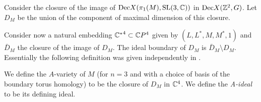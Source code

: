 Consider the closure of the image of $\mathrm{Dec}X(\pi_1(M),\textrm{SL}(3,\mathbb{C}))$ in $\mathrm{Dec}X(\mathbb Z^2,G)$.   Let $D_M$  be the union of the component of maximal dimension of this closure.

Consider now a natural embedding  ${\mathbb{C}^*}^4\subset \mathbb{C} P^4$ given by ${(L,L^*,M,M^*,1)}$ and $\bar D_M$ the closure of the 
image of $D_M$. The ideal boundary of $D_M$ is $\bar D_M\setminus D_M$.  Essentially the following definition was given independently in \cite{Zickert-A-pol}. 

\begin{defn}\label{defaideal}
We define the $A$-variety of $M$ (for $n=3$ and with a choice of basis of the boundary torus homology) to be the closure of $D_M$ in  $\mathbb{C}^4$.
We define the \emph{A-ideal} to be its defining ideal.
\end{defn}

